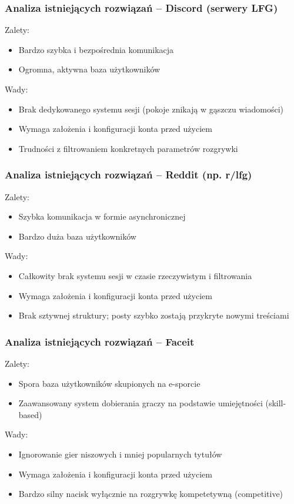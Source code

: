 \documentclass{beamer}
\begin{document}
	\begin{frame}
		\frametitle{Analiza istniejących rozwiązań -- Discord (serwery LFG)}
		
		Zalety:
		\begin{itemize}
			\item Bardzo szybka i bezpośrednia komunikacja
			\item Ogromna, aktywna baza użytkowników
		\end{itemize}
		Wady:
		\begin{itemize}
			\item Brak dedykowanego systemu sesji (pokoje znikają w gąszczu wiadomości)
			\item Wymaga założenia i konfiguracji konta przed użyciem
			\item Trudności z filtrowaniem konkretnych parametrów rozgrywki
		\end{itemize}
	\end{frame}
	
	\begin{frame}
		\frametitle{Analiza istniejących rozwiązań -- Reddit (np. r/lfg)}
		
		Zalety:
		\begin{itemize}
			\item Szybka komunikacja w formie asynchronicznej
			\item Bardzo duża baza użytkowników
		\end{itemize}
		Wady:
		\begin{itemize}
			\item Całkowity brak systemu sesji w czasie rzeczywistym i filtrowania
			\item Wymaga założenia i konfiguracji konta przed użyciem
			\item Brak sztywnej struktury; posty szybko zostają przykryte nowymi treściami
		\end{itemize}
	\end{frame}
	
	\begin{frame}
		\frametitle{Analiza istniejących rozwiązań -- Faceit}
		
		Zalety:
		\begin{itemize}
			\item Spora baza użytkowników skupionych na e-sporcie
			\item Zaawansowany system dobierania graczy na podstawie umiejętności (skill-based)
		\end{itemize}
		Wady:
		\begin{itemize}
			\item Ignorowanie gier niszowych i mniej popularnych tytułów
			\item Wymaga założenia i konfiguracji konta przed użyciem
			\item Bardzo silny nacisk wyłącznie na rozgrywkę kompetetywną (competitive)
		\end{itemize}
	\end{frame}
	
\end{document}
